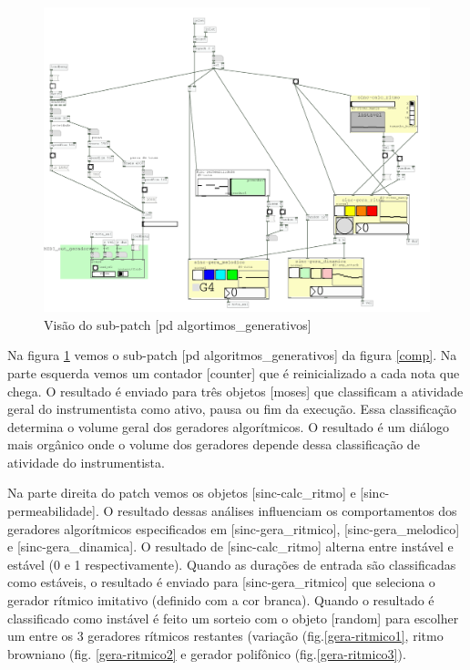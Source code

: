 \documentclass[draft]{ppgmus}
\begin{document}


\begin{figure}
\includegraphics[scale=.4]{algoritmo}
\caption{Visão do sub-patch [pd algortimos\_generativos]}
\label{algoritmo}
\end{figure}


Na figura \ref{algoritmo} vemos o sub-patch [pd algoritmos\_generativos] da figura \ref{comp}.
Na parte esquerda vemos um contador [counter] que é reinicializado a cada nota que chega. O resultado
é enviado para três objetos [moses] que classificam a atividade geral do instrumentista como
 ativo, pausa ou fim da execução. Essa classificação determina o volume geral dos geradores algorítmicos.
O resultado é um diálogo mais orgânico onde o volume dos geradores depende dessa classificação de 
atividade do instrumentista. 

Na parte direita do patch vemos os objetos [sinc-calc\_ritmo] e [sinc-permeabilidade].
O resultado dessas análises influenciam os comportamentos dos geradores algorítmicos especificados em
[sinc-gera\_ritmico], [sinc-gera\_melodico] e [sinc-gera\_dinamica]. O resultado de [sinc-calc\_ritmo] 
alterna entre instável e estável (0 e 1 respectivamente). Quando as durações de entrada são classificadas
como estáveis, o resultado é enviado para [sinc-gera\_ritmico] que seleciona o gerador rítmico imitativo 
(definido com a cor branca). Quando o resultado é classificado como instável é feito um sorteio com o
objeto [random] para escolher um entre os 3 geradores rítmicos restantes (variação (fig.\ref{gera-ritmico1}, ritmo
browniano (fig. \ref{gera-ritmico2} e gerador polifônico (fig.\ref{gera-ritmico3}).
\end{document}
